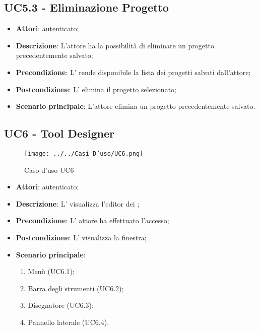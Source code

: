 \subsection{UC5.3 - Eliminazione Progetto}
\label{ssec:UC5.3}
\begin{itemize}
\item \textbf{Attori}:  autenticato;
\item \textbf{Descrizione}: L'attore ha la possibilità di eliminare un progetto precedentemente salvato;
\item \textbf{Precondizione}: L’ rende disponibile la lista dei progetti salvati dall'attore;
\item \textbf{Postcondizione}: L’ elimina il progetto selezionato;
\item \textbf{Scenario principale}: L'attore elimina un progetto precedentemente salvato.
\end{itemize}
\newpage
\subsection{UC6 - Tool Designer}
\label{ssec:UC6}
\begin{figure}[h!]
\centering
\texttt{[image: ../../Casi D'uso/UC6.png]}
\caption{Caso d'uso UC6}
 \end{figure}
\begin{itemize}
\item \textbf{Attori}:  autenticato;
\item \textbf{Descrizione}: L' visualizza l'editor dei ;
\item \textbf{Precondizione}: L' attore ha effettuato l'accesso;
\item \textbf{Postcondizione}: L' visualizza la finestra;
\item \textbf{Scenario principale}: \begin{enumerate}\item Menù (UC6.1);\item Barra degli strumenti (UC6.2);\item Disegnatore  (UC6.3);\item Pannello laterale (UC6.4).
 \end{enumerate}
\end{itemize}
\newpage
